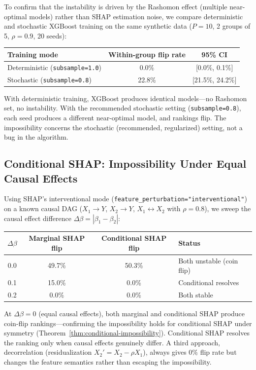 \documentclass{jmlr}
\begin{document}
To confirm that the instability is driven by the Rashomon effect (multiple near-optimal models) rather than SHAP estimation noise, we compare deterministic and stochastic XGBoost training on the same synthetic data ($P{=}10$, 2 groups of 5, $\rho{=}0.9$, 20 seeds):

\begin{center}
\small
\begin{tabular}{@{}lcc@{}}
\toprule
Training mode & Within-group flip rate & 95\% CI \\
\midrule
Deterministic (\texttt{subsample=1.0}) & 0.0\% & [0.0\%, 0.1\%] \\
Stochastic (\texttt{subsample=0.8}) & 22.8\% & [21.5\%, 24.2\%] \\
\bottomrule
\end{tabular}
\end{center}

With deterministic training, XGBoost produces identical models---no Rashomon set, no instability.
With the recommended stochastic setting (\texttt{subsample=0.8}), each seed produces a different near-optimal model, and rankings flip.
The impossibility concerns the stochastic (recommended, regularized) setting, not a bug in the algorithm.

\subsection{Conditional SHAP: Impossibility Under Equal Causal Effects}
\label{sec:conditional-experiment}

Using SHAP's interventional mode (\texttt{feature\_perturbation="interventional"}) on a known causal DAG ($X_1 \to Y$, $X_2 \to Y$, $X_1 \leftrightarrow X_2$ with $\rho{=}0.8$), we sweep the causal effect difference $\Delta\beta = |\beta_1 - \beta_2|$:

\begin{center}
\small
\begin{tabular}{@{}cccl@{}}
\toprule
$\Delta\beta$ & Marginal SHAP flip & Conditional SHAP flip & Status \\
\midrule
0.0 & 49.7\% & 50.3\% & Both unstable (coin flip) \\
0.1 & 15.0\% & 0.0\% & Conditional resolves \\
0.2 & 0.0\% & 0.0\% & Both stable \\
\bottomrule
\end{tabular}
\end{center}

At $\Delta\beta = 0$ (equal causal effects), both marginal and conditional SHAP produce coin-flip rankings---confirming the impossibility holds for conditional SHAP under symmetry (Theorem~\ref{thm:conditional-impossibility}). Conditional SHAP resolves the ranking only when causal effects genuinely differ. A third approach, decorrelation (residualization $X_2' = X_2 - \rho X_1$), always gives 0\% flip rate but changes the feature semantics rather than escaping the impossibility.
\end{document}
